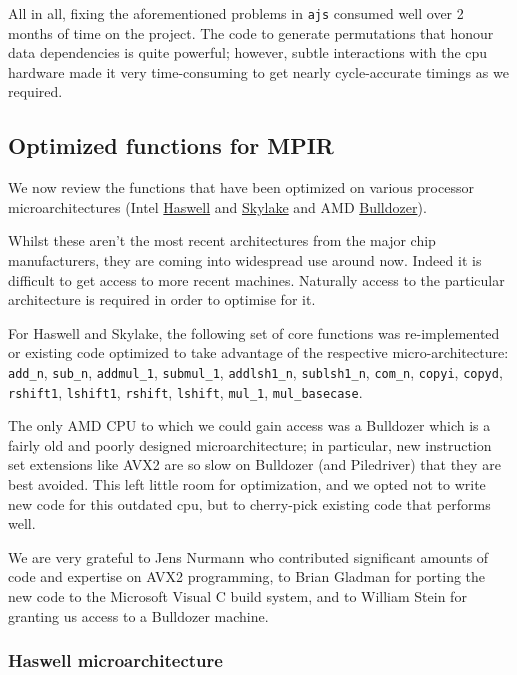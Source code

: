 All in all, fixing the aforementioned problems in \texttt{ajs} consumed
well over 2 months of time on the project. The code to generate
permutations that honour data dependencies is quite powerful; however,
subtle interactions with the cpu hardware made it very time-consuming to
get nearly cycle-accurate timings as we required.

\subsection{Optimized functions for
MPIR}\label{optimized-functions-for-mpir}

We now review the functions that have been optimized on various
processor microarchitectures (Intel
\href{https://en.wikipedia.org/wiki/Haswell_(microarchitecture)}{Haswell}
and
\href{https://en.wikipedia.org/wiki/Skylake_(microarchitecture)}{Skylake}
and AMD
\href{https://en.wikipedia.org/wiki/Bulldozer_(microarchitecture)}{Bulldozer}).

Whilst these aren't the most recent architectures from the major chip
manufacturers, they are coming into widespread use around now. Indeed it
is difficult to get access to more recent machines. Naturally access to
the particular architecture is required in order to optimise for it.

For Haswell and Skylake, the following set of core functions was
re-implemented or existing code optimized to take advantage of the
respective micro-architecture: \texttt{add\_n}, \texttt{sub\_n},
\texttt{addmul\_1}, \texttt{submul\_1}, \texttt{addlsh1\_n},
\texttt{sublsh1\_n}, \texttt{com\_n}, \texttt{copyi}, \texttt{copyd},
\texttt{rshift1}, \texttt{lshift1}, \texttt{rshift}, \texttt{lshift},
\texttt{mul\_1}, \texttt{mul\_basecase}.

The only AMD CPU to which we could gain access was a Bulldozer which is
a fairly old and poorly designed microarchitecture; in particular, new
instruction set extensions like AVX2 are so slow on Bulldozer (and
Piledriver) that they are best avoided. This left little room for
optimization, and we opted not to write new code for this outdated cpu,
but to cherry-pick existing code that performs well.

We are very grateful to Jens Nurmann who contributed significant amounts
of code and expertise on AVX2 programming, to Brian Gladman for porting
the new code to the Microsoft Visual C build system, and to William
Stein for granting us access to a Bulldozer machine.

\subsubsection{Haswell
microarchitecture}\label{haswell-microarchitecture}

